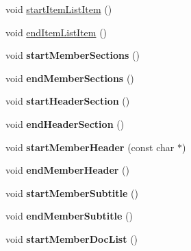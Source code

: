 \begin{DoxyCompactItemize}
\item 
void \hyperlink{class_latex_generator_ab4ab0e8996b14723e45e955fe68f03bc}{start\-Item\-List\-Item} ()
\item 
void \hyperlink{class_latex_generator_a61efca8a19608566df04a45d16e88449}{end\-Item\-List\-Item} ()
\item 
\hypertarget{class_latex_generator_aa363f7f143f8451b0fd035e9856f1b87}{void {\bfseries start\-Member\-Sections} ()}\label{class_latex_generator_aa363f7f143f8451b0fd035e9856f1b87}

\item 
\hypertarget{class_latex_generator_a2f9645e00372366ad64476dbc66cd5ac}{void {\bfseries end\-Member\-Sections} ()}\label{class_latex_generator_a2f9645e00372366ad64476dbc66cd5ac}

\item 
\hypertarget{class_latex_generator_add9e7a492a43830dd3c77cd0e5c06884}{void {\bfseries start\-Header\-Section} ()}\label{class_latex_generator_add9e7a492a43830dd3c77cd0e5c06884}

\item 
\hypertarget{class_latex_generator_aeca202ed7306f7d9aa20f8e707d96301}{void {\bfseries end\-Header\-Section} ()}\label{class_latex_generator_aeca202ed7306f7d9aa20f8e707d96301}

\item 
\hypertarget{class_latex_generator_ae6947537ee279d8d1fe810bc69b3fc7f}{void {\bfseries start\-Member\-Header} (const char $\ast$)}\label{class_latex_generator_ae6947537ee279d8d1fe810bc69b3fc7f}

\item 
\hypertarget{class_latex_generator_a618c1bfc8806d29116abac6b5817c137}{void {\bfseries end\-Member\-Header} ()}\label{class_latex_generator_a618c1bfc8806d29116abac6b5817c137}

\item 
\hypertarget{class_latex_generator_a7cf4dbf258928f842c9e96807345bc7a}{void {\bfseries start\-Member\-Subtitle} ()}\label{class_latex_generator_a7cf4dbf258928f842c9e96807345bc7a}

\item 
\hypertarget{class_latex_generator_a8073c2e7983bc4cd328e4229f51f3bbf}{void {\bfseries end\-Member\-Subtitle} ()}\label{class_latex_generator_a8073c2e7983bc4cd328e4229f51f3bbf}

\item 
\hypertarget{class_latex_generator_a45f1ccc157c1f0a3797f633881b4945e}{void {\bfseries start\-Member\-Doc\-List} ()}\label{class_latex_generator_a45f1ccc157c1f0a3797f633881b4945e}


\end{DoxyCompactItemize}

